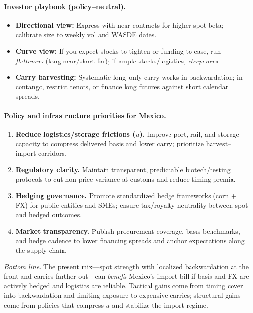 \documentclass[11pt,a4paper]{article} %
\begin{document}
\paragraph{Investor playbook (policy–neutral).}
\begin{itemize}
  \item \textbf{Directional view:} Express with near contracts for higher spot beta; calibrate size to weekly vol and WASDE dates.
  \item \textbf{Curve view:} If you expect stocks to tighten or funding to ease, run \emph{flatteners} (long near/short far); if ample stocks/logistics, \emph{steepeners}.
  \item \textbf{Carry harvesting:} Systematic long–only carry works in backwardation; in contango, restrict tenors, or finance long futures against short calendar spreads.
\end{itemize}

\paragraph{Policy and infrastructure priorities for Mexico.}
\begin{enumerate}
  \item \textbf{Reduce logistics/storage frictions (\(u\)).} Improve port, rail, and storage capacity to compress delivered basis and lower carry; prioritize harvest–import corridors.
  \item \textbf{Regulatory clarity.} Maintain transparent, predictable biotech/testing protocols to cut non-price variance at customs and reduce timing premia.
  \item \textbf{Hedging governance.} Promote standardized hedge frameworks (corn + FX) for public entities and SMEs; ensure tax/royalty neutrality between spot and hedged outcomes.
  \item \textbf{Market transparency.} Publish procurement coverage, basis benchmarks, and hedge cadence to lower financing spreads and anchor expectations along the supply chain.
\end{enumerate}

\noindent\emph{Bottom line.} The present mix—spot strength with localized backwardation at the front and carries farther out—can \emph{benefit} Mexico’s import bill if basis and FX are actively hedged and logistics are reliable. Tactical gains come from timing cover into backwardation and limiting exposure to expensive carries; structural gains come from policies that compress \(u\) and stabilize the import regime.
\end{document}
